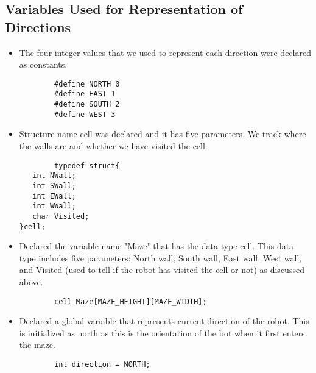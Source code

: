 \documentclass[11pt]{article}
\begin{document}
\subsection{Variables Used for Representation of Directions}
\begin{itemize}
\item The four integer values that we used to represent each direction were declared as constants. 
	\begin{verbatim}
		#define NORTH 0
		#define EAST 1
		#define SOUTH 2
		#define WEST 3
	\end{verbatim}
\item Structure name cell was declared and it has five parameters. We track where the walls are and whether we have visited the cell.
	\begin{verbatim}
		typedef struct{
   int NWall; 
   int SWall; 
   int EWall; 
   int WWall; 
   char Visited;
}cell;\end{verbatim}
\item Declared the variable name "Maze" that has the data type cell. This data type includes five parameters: North wall, South wall, East wall, West wall, and Visited (used to tell if the robot has visited the cell or not) as discussed above.
	\begin{verbatim}
		cell Maze[MAZE_HEIGHT][MAZE_WIDTH];
	\end{verbatim}
\item Declared a global variable that represents current direction of the robot. This is initialized as north as this is the orientation of the bot when it first enters the maze.
	\begin{verbatim}
		int direction = NORTH;
	\end{verbatim}
\end{itemize}
\end{document}
